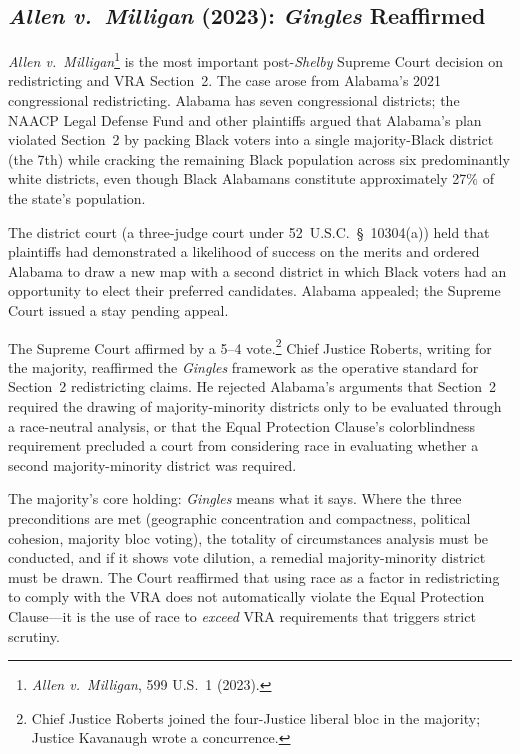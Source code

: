 \label{sec:results}

\subsection{\textit{Allen v.\ Milligan} (2023): \textit{Gingles} Reaffirmed}

\textit{Allen v.\ Milligan}\footnote{\textit{Allen v.\ Milligan}, 599 U.S.\
1 (2023).} is the most important post-\textit{Shelby} Supreme Court decision
on redistricting and VRA Section~2. The case arose from Alabama's 2021
congressional redistricting. Alabama has seven congressional districts;
the NAACP Legal Defense Fund and other plaintiffs argued that Alabama's
plan violated Section~2 by packing Black voters into a single majority-Black
district (the 7th) while cracking the remaining Black population across
six predominantly white districts, even though Black Alabamans constitute
approximately 27\% of the state's population.

The district court (a three-judge court under 52~U.S.C.~\S~10304(a))
held that plaintiffs had demonstrated a likelihood of success on the merits
and ordered Alabama to draw a new map with a second district in which
Black voters had an opportunity to elect their preferred candidates.
Alabama appealed; the Supreme Court issued a stay pending appeal.

The Supreme Court affirmed by a 5--4 vote.\footnote{Chief Justice Roberts
joined the four-Justice liberal bloc in the majority; Justice Kavanaugh
wrote a concurrence.} Chief Justice Roberts, writing for the majority,
reaffirmed the \textit{Gingles} framework as the operative standard for
Section~2 redistricting claims. He rejected Alabama's arguments that
Section~2 required the drawing of majority-minority districts only to be
evaluated through a race-neutral analysis, or that the Equal Protection
Clause's colorblindness requirement precluded a court from considering
race in evaluating whether a second majority-minority district was required.

The majority's core holding: \textit{Gingles} means what it says. Where
the three preconditions are met (geographic concentration and compactness,
political cohesion, majority bloc voting), the totality of circumstances
analysis must be conducted, and if it shows vote dilution, a remedial
majority-minority district must be drawn. The Court reaffirmed that using
race as a factor in redistricting to comply with the VRA does not
automatically violate the Equal Protection Clause---it is the use of race
to \textit{exceed} VRA requirements that triggers strict scrutiny.


